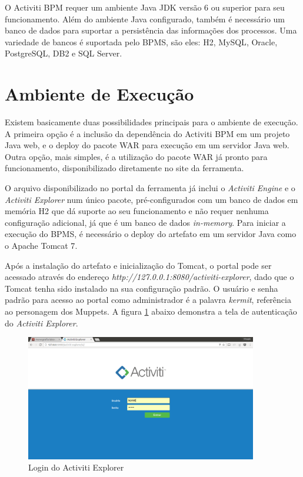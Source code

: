O Activiti BPM requer um ambiente Java JDK versão 6 ou superior para seu funcionamento. Além do ambiente Java configurado, também é necessário um banco de dados para suportar a persistência das informações dos processos. Uma variedade de bancos é suportada pelo BPMS, são eles: H2\cite{db_h2}, MySQL\cite{db_mysql}, Oracle\cite{db_oracle}, PostgreSQL\cite{db_postgres}, DB2\cite{db_db2} e SQL Server\cite{db_sqlserver}.

\section{Ambiente de Execução}\label{sec:automatizacao_processos-ambiente_desenvolvimento}

Existem basicamente duas possibilidades principais para o ambiente de execução. A primeira opção é a inclusão da dependência do Activiti BPM em um projeto Java web, e o deploy do pacote WAR\cite{war} para execução em um servidor Java web. Outra opção, mais simples, é a utilização do pacote WAR já pronto para funcionamento, disponibilizado diretamente no site da ferramenta\cite{activiti_download}.

O arquivo disponibilizado no portal da ferramenta já inclui o \textit{Activiti Engine} e o \textit{Activiti Explorer} num único pacote, pré-configurados com um banco de dados em memória H2\cite{h2_inmemory} que dá suporte ao seu funcionamento e não requer nenhuma configuração adicional, já que é um banco de dados \textit{in-memory}\cite{h2_inmemory}. Para iniciar a execução do BPMS, é necessário o deploy do artefato em um servidor Java como o Apache Tomcat 7\cite{tomcat7}.

Após a instalação do artefato e inicialização do Tomcat, o portal pode ser acessado através do endereço \textit{http://127.0.0.1:8080/activiti-explorer}, dado que o Tomcat tenha sido instalado na sua configuração padrão. O usuário e senha padrão para acesso ao portal como administrador é a palavra \textit{kermit}, referência ao personagem dos Muppets\cite{kermit}. A figura \ref{fig:activiti_login} abaixo demonstra a tela de autenticação do \textit{Activiti Explorer}.

\begin{figure}[H]
\centering
\includegraphics[width=0.9\textwidth]{imagens/activiti_login.png}
\caption{Login do Activiti Explorer}
\label{fig:activiti_login}
\end{figure}

